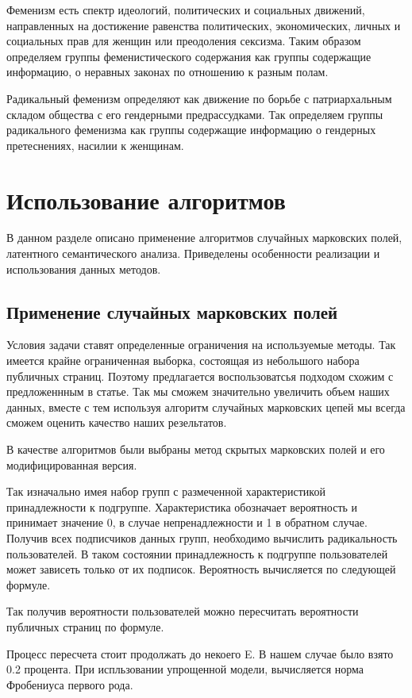 \documentclass[annotation,times,page4]{itmo-student-thesis}
\begin{document}
Феменизм есть спектр идеологий, политических и социальных движений, направленных на достижение равенства политических, экономических, личных и социальных прав для женщин или преодоления сексизма. Таким образом определяем группы феменистического содержания как группы содержащие информацию, о неравных законах по отношению к разным полам. 

Радикальный феменизм определяют как движение по борьбе с патриархальным складом общества с его гендерными предрассудками. Так определяем группы радикального феменизма как группы содержащие информацию о гендерных претеснениях, насилии к женщинам.

 
\section{Использование алгоритмов}
В данном разделе описано применение алгоритмов случайных марковских полей, латентного семантического анализа. Приведелены особенности реализации и использования данных методов.
\subsection{Применение случайных марковских полей}
Условия задачи ставят определенные ограничения на используемые методы. Так имеется крайне ограниченная выборка, состоящая из небольшого набора публичных страниц. Поэтому предлагается воспользоватсья подходом схожим с предложеннным в статье. Так мы сможем значительно увеличить объем наших данных, вместе с тем используя алгоритм случайных марковских цепей мы всегда сможем оценить качество наших резельтатов.

В качестве алгоритмов были выбраны метод скрытых марковских полей и его модифицированная версия.

Так изначально имея набор групп с размеченной характеристикой принадлежности к подгруппе. Характеристика обозначает вероятность и принимает значение 0, в случае непренадлежности и 1 в обратном случае. Получив всех подписчиков данных групп, необходимо вычислить радикальность пользователей. В таком состоянии принадлежность к подгруппе пользователей может зависеть только от их подписок. Вероятность вычисляется по следующей формуле.

Так получив вероятности пользователей можно пересчитать вероятности публичных страниц по формуле. 

Процесс пересчета стоит продолжать до некоего E. В нашем случае было взято 0.2 процента.
При испльзовании упрощенной модели, вычисляется норма Фробениуса первого рода.   
\end{document}
